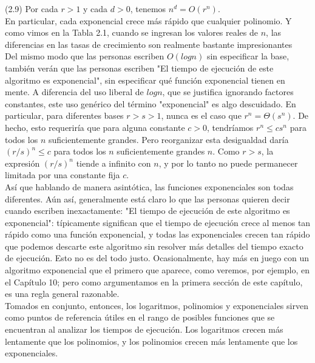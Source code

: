 \documentclass[a4paper, 12pt]{book}
\begin{document}
(2.9) Por cada $r>1$ y cada $d>0$, tenemos $n^d=O(r^n)$.\\

En particular, cada exponencial crece más rápido que cualquier polinomio. Y como vimos en la Tabla 2.1, cuando se ingresan los valores reales de $n$, las diferencias en las tasas de crecimiento son realmente bastante impresionantes\\

Del mismo modo que las personas escriben $O(log n)$ sin especificar la base, también verán que las personas escriben "El tiempo de ejecución de este algoritmo es exponencial", sin especificar qué función exponencial tienen en mente. A diferencia del uso liberal de $log n$, que se justifica ignorando factores constantes, este uso genérico del término "exponencial" es algo descuidado. En particular, para diferentes bases $r>s>1$, nunca es el caso que $r^n = \Theta(s^n)$. De hecho, esto requeriría que para alguna constante $c>0$, tendríamos $r^n ≤ cs^n$ para todos los $n$ suficientemente grandes. Pero reorganizar esta desigualdad daría $(r/s)^n ≤ c$ para todos los $n$ suficientemente grandes $n$. Como $r>s$, la expresión $(r/s)^n$ tiende a infinito con $n$, y por lo tanto no puede permanecer limitada por una constante fija $c$.\\

Así que hablando de manera asintótica, las funciones exponenciales son todas diferentes. Aún así, generalmente está claro lo que las personas quieren decir cuando escriben inexactamente: "El tiempo de ejecución de este algoritmo es exponencial": típicamente significan que el tiempo de ejecución crece al menos tan rápido como una función exponencial, y todas las exponenciales crecen tan rápido que podemos descarte este algoritmo sin resolver más detalles del tiempo exacto de ejecución. Esto no es del todo justo. Ocasionalmente, hay más en juego con un algoritmo exponencial que el primero que aparece, como veremos, por ejemplo, en el Capítulo 10; pero como argumentamos en la primera sección de este capítulo, es una regla general razonable.\\

Tomados en conjunto, entonces, los logaritmos, polinomios y exponenciales sirven como puntos de referencia útiles en el rango de posibles funciones que se encuentran al analizar los tiempos de ejecución. Los logaritmos crecen más lentamente que los polinomios, y los polinomios crecen más lentamente que los exponenciales.\\
\end{document}
